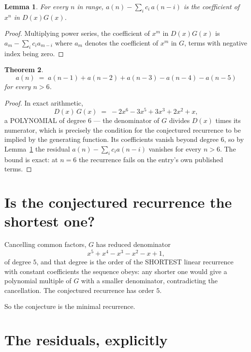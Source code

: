 \documentclass[11pt,a4paper]{article}
\theoremstyle{plain}
\newtheorem{theorem}{Theorem}
\newtheorem{lemma}[theorem]{Lemma}
\theoremstyle{definition}
\begin{document}
\begin{lemma}\label{lem:key}
For every $n$ in range, $a(n)-\sum_i c_i\,a(n-i)$ is the coefficient of $x^{n}$ in
$D(x)G(x)$.
\end{lemma}

\begin{proof}
Multiplying power series, the coefficient of $x^{m}$ in $D(x)G(x)$ is
$a_m-\sum_i c_i a_{m-i}$ where $a_m$ denotes the coefficient of $x^{m}$ in $G$, terms with
negative index being zero.
\end{proof}

\begin{theorem}
\[
a(n)\;=\;a(n-1) + a(n-2) + a(n-3) - a(n-4) - a(n-5)
\]
for every $n>6$.
\end{theorem}

\begin{proof}
In exact arithmetic,
\[
D(x)\,G(x)\;=\;- 2 x^{6} - 3 x^{5} + 3 x^{3} + 2 x^{2} + x,
\]
a POLYNOMIAL of degree $6$ --- the denominator of $G$ divides $D(x)$ times its numerator,
which is precisely the condition for the conjectured recurrence to be implied by the
generating function. Its coefficients vanish beyond degree $6$, so by
Lemma~\ref{lem:key} the residual $a(n)-\sum_ic_ia(n-i)$ vanishes for every
$n>6$. The bound is exact: at $n=6$ the recurrence fails on the entry's own published terms.
\end{proof}

\section{Is the conjectured recurrence the shortest one?}

Cancelling common factors, $G$ has reduced denominator
\[
x^{5} + x^{4} - x^{3} - x^{2} - x + 1,
\]
of degree $5$, and that degree is the order of the SHORTEST linear recurrence with
constant coefficients the sequence obeys: any shorter one would give a polynomial multiple of
$G$ with a smaller denominator, contradicting the cancellation. The conjectured recurrence has
order $5$.

So the conjecture is the minimal recurrence.

\section{The residuals, explicitly}
\end{document}
